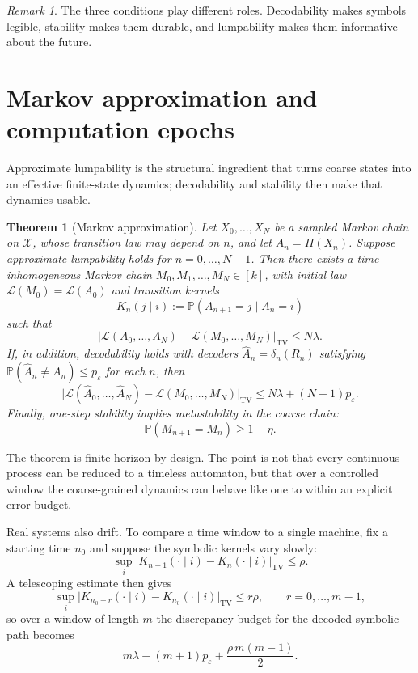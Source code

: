 \documentclass[11pt,a4paper]{article}
\newtheorem{theorem}{Theorem}
\theoremstyle{definition}
\theoremstyle{remark}
\newtheorem{remark}{Remark}
\newcommand{\TV}{\mathrm{TV}}
\newcommand{\Lc}{\mathcal{L}}
\newcommand{\Xc}{\mathcal{X}}
\begin{document}
\begin{remark}
The three conditions play different roles. Decodability makes symbols legible, stability makes them durable, and lumpability makes them informative about the future.
\end{remark}

\section{Markov approximation and computation epochs}\label{sec:markov}

Approximate lumpability is the structural ingredient that turns coarse states into an effective finite-state dynamics; decodability and stability then make that dynamics usable.

\begin{theorem}[Markov approximation]\label{thm:markov}
Let $X_0,\ldots,X_N$ be a sampled Markov chain on $\Xc$, whose transition law may depend on $n$, and let $A_n=\Pi(X_n)$. Suppose approximate lumpability holds for $n=0,\ldots,N-1$. Then there exists a time-inhomogeneous Markov chain $M_0,M_1,\ldots,M_N \in [k]$, with initial law $\Lc(M_0)=\Lc(A_0)$ and transition kernels
\[
K_n(j \mid i) := \mathbb{P}(A_{n+1}=j \mid A_n=i)
\]
such that
\begin{equation}\label{eq:markov-bound}
\bigl|\Lc(A_0,\ldots,A_N)-\Lc(M_0,\ldots,M_N)\bigr|_{\TV}
\leq N\lambda.
\end{equation}
If, in addition, decodability holds with decoders $\hat{A}_n=\delta_n(R_n)$ satisfying $\mathbb{P}(\hat{A}_n\neq A_n)\leq p_\varepsilon$ for each $n$, then
\begin{equation}\label{eq:decoded-bound}
\bigl|\Lc(\hat{A}_0,\ldots,\hat{A}_N)-\Lc(M_0,\ldots,M_N)\bigr|_{\TV}
\leq N\lambda + (N+1)p_\varepsilon.
\end{equation}
Finally, one-step stability implies metastability in the coarse chain:
\[
\mathbb{P}(M_{n+1}=M_n) \geq 1-\eta.
\]
\end{theorem}

The theorem is finite-horizon by design. The point is not that every continuous process can be reduced to a timeless automaton, but that over a controlled window the coarse-grained dynamics can behave like one to within an explicit error budget.

Real systems also drift. To compare a time window to a single machine, fix a starting time $n_0$ and suppose the symbolic kernels vary slowly:
\[
\sup_i \bigl|K_{n+1}(\cdot \mid i) - K_n(\cdot \mid i)\bigr|_{\TV} \leq \rho.
\]
A telescoping estimate then gives
\[
\sup_i \bigl|K_{n_0+r}(\cdot \mid i) - K_{n_0}(\cdot \mid i)\bigr|_{\TV} \leq r\rho,
\qquad r=0,\ldots,m-1,
\]
so over a window of length $m$ the discrepancy budget for the decoded symbolic path becomes
\[
m\lambda + (m+1)p_\varepsilon + \frac{\rho\,m(m-1)}{2}.
\]
\end{document}
